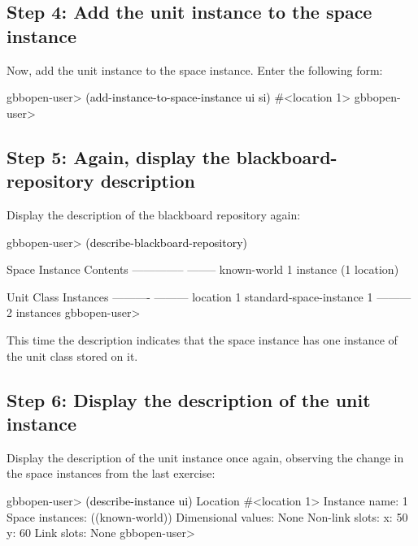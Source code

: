\documentclass[10pt,twoside,english,pdftex]{article}
\begin{document}
\subsection*{Step 4: Add the unit instance to the space instance}

%
%
Now, add the  unit instance to the space instance.
Enter the following form:
%
\W\supp
\begin{example}
\textcolor{darkergray}{%
  gbbopen-user> \textcolor{black}{(add-instance-to-space-instance ui si)}
  #<location 1>
  gbbopen-user>}
\end{example}

\subsection*{Step 5: Again, display the blackboard-repository description}

%
Display the description of the blackboard repository again:
%
\W\supp
\begin{example}
\textcolor{darkergray}{%
  gbbopen-user> \textcolor{black}{(describe-blackboard-repository)}
  
  Space Instance                Contents
  --------------                --------
  known-world                   1 instance (1 location)

  Unit Class                    Instances
  ----------                    ---------
  location                              1
  standard-space-instance               1
                                ---------
                                        2 instances
  gbbopen-user>}
\end{example}

This time the description indicates that the  space instance
has one instance of the  unit class stored on it.

\subsection*{Step 6: Display the description of the unit instance}

%
Display the description of the  unit instance once again,
observing the change in the space instances from the last exercise:
%
\W\supp
\begin{example}
\textcolor{darkergray}{%
  gbbopen-user> \textcolor{black}{(describe-instance ui)}
  Location #<location 1>
    Instance name: 1
    Space instances: ((known-world))
    Dimensional values: None
    Non-link slots:
      x:  50
      y:  60
    Link slots: None
  gbbopen-user>}
\end{example}
\end{document}
